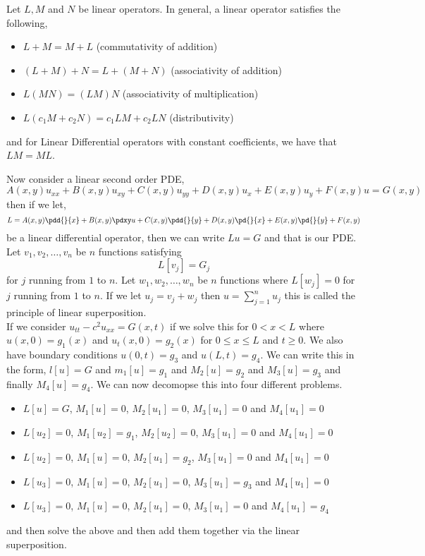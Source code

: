 \begin{nlemma}
  Let $L, M$ and $N$ be linear operators. In general, a linear operator satisfies the following,
  \begin{itemize}
    \item $L + M = M + L$ (commutativity of addition)
    \item $(L + M) + N = L + (M + N)$ (associativity of addition)
    \item $L(MN) = (LM)N$ (associativity of multiplication)
    \item $L(c_1M + c_2N) = c_1LM + c_2LN$ (distributivity)
  \end{itemize}
  and for Linear Differential operators with constant coefficients, we have that $LM = ML$.
\end{nlemma}

Now consider a linear second order PDE,
$$A(x, y)u_{xx} + B(x, y)u_{xy} + C(x, y)u_{yy} + D(x, y)u_x + E(x, y)u_y + F(x, y)u = G(x, y)$$
then if we let,
$$ L = A(x, y)\pdd{}{x} + B(x, y)\pdxy u + C(x, y)\pdd{}{y} + D(x, y)\pd{}{x} + E(x, y)\pd{}{y} + F(x, y) $$
be a linear differential operator, then we can write $Lu = G$ and that is our PDE.\\

Let $v_1, v_2, \dots, v_n$ be $n$ functions satisfying
$$ L[v_j] = G_j $$
 for $j$ running from $1$ to $n$. Let $w_1, w_2, \dots, w_n$ be $n$ functions where $L[w_j] = 0$ for $j$ running from $1$ to $n$. If we let $u_j = v_j + w_j$ then $u=  \sum_{j=1}^n u_j$ this is called the principle of linear superposition.\\

\noindent
If we consider $u_{tt} - c^2u_{xx} = G(x, t)$ if we solve this for $0 < x < L$ where $u(x, 0) = g_1(x)$ and $u_t(x, 0) = g_2(x)$ for $0 \le x \le L$ and $t \ge 0$. We also have boundary conditions $u(0, t) = g_3$ and $u(L, t) = g_4$. We can write this in the form, $l[u] = G$ and $m_1[u] = g_1$ and $M_2[u] = g_2$ and $M_3[u] = g_3$ and finally $M_4[u] = g_4$. We can now decomopse this into four different problems.
\begin{itemize}
  \item $L[u] = G$, $M_1[u] = 0$, $M_2[u_1] = 0$, $M_3[u_1] = 0$ and $M_4[u_1] = 0$
  \item $L[u_2] = 0$, $M_1[u_2] = g_1$, $M_2[u_2] = 0$, $M_3[u_1] = 0$ and $M_4[u_1] = 0$
  \item $L[u_2] = 0$, $M_1[u] = 0$, $M_2[u_1] = g_2$, $M_3[u_1] = 0$ and $M_4[u_1] = 0$
  \item $L[u_3] = 0$, $M_1[u] = 0$, $M_2[u_1] = 0$, $M_3[u_1] = g_3$ and $M_4[u_1] = 0$
  \item $L[u_3] = 0$, $M_1[u] = 0$, $M_2[u_1] = 0$, $M_3[u_1] = 0$ and $M_4[u_1] = g_4$
\end{itemize}
and then solve the above and then add them together via the linear superposition.

